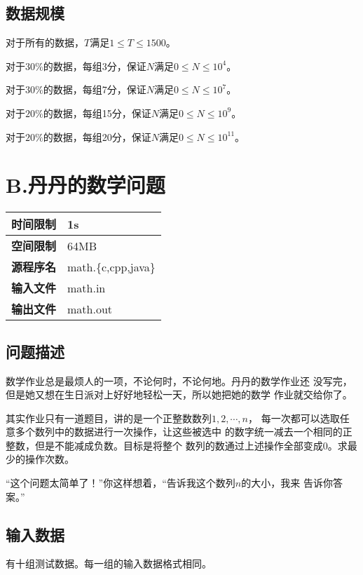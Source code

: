\documentclass{article}
\begin{document}
\subsection*{数据规模}
对于所有的数据，$T$满足$1 \leq T \leq 1500$。

对于$30\%$的数据，每组3分，保证$N$满足$0 \leq N \leq 10^{4}$。


对于$30\%$的数据，每组7分，保证$N$满足$0 \leq N \leq 10^{7}$。


对于$20\%$的数据，每组15分，保证$N$满足$0 \leq N \leq 10^{9}$。


对于$20\%$的数据，每组20分，保证$N$满足$0 \leq N \leq 10^{11}$。

\clearpage

\section*{B.丹丹的数学问题}
\begin{longtable}{|c|l|}
 \hline \bfseries{时间限制} & 1s \\
 \hline \bfseries{空间限制} & 64MB \\
 \hline \bfseries{源程序名} & math.\{c,cpp,java\} \\
 \hline \bfseries{输入文件} & math.in \\
 \hline \bfseries{输出文件} & math.out \\
 \hline 
\end{longtable}

\subsection*{问题描述}
数学作业总是最烦人的一项，不论何时，不论何地。丹丹的数学作业还
没写完，但是她又想在生日派对上好好地轻松一天，所以她把她的数学
作业就交给你了。

其实作业只有一道题目，讲的是一个正整数数列$1, 2, \cdots , n$，
每一次都可以选取任意多个数列中的数据进行一次操作，让这些被选中
的数字统一减去一个相同的正整数，但是不能减成负数。目标是将整个
数列的数通过上述操作全部变成0。求最少的操作次数。

“这个问题太简单了！”你这样想着，“告诉我这个数列$n$的大小，我来
告诉你答案。”

\subsection*{输入数据}
有十组测试数据。每一组的输入数据格式相同。
\end{document}
